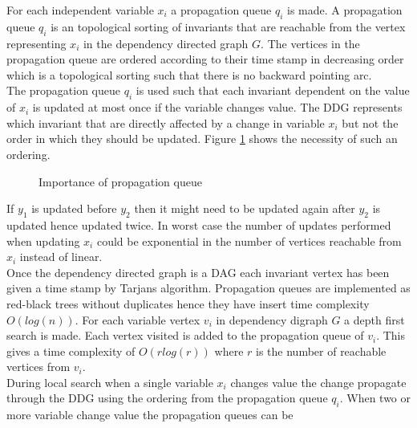 For each independent variable $x_i$ a propagation queue $q_i$ is made. A propagation queue $q_i$ is an 
topological sorting of invariants that are reachable from the vertex representing $x_i$ in the dependency directed 
graph $G$. The vertices in the propagation queue are ordered according to their time stamp in decreasing 
order which is a topological sorting such that there is no backward pointing arc. \\
The propagation queue $q_i$ is used such that each invariant dependent on the value of $x_i$ is updated at most once if 
the variable changes value. The DDG represents which invariant that are directly affected by a change in variable $x_i$ 
but not the order in which they should be updated. Figure \ref{fig_propqueue} shows the necessity of such an ordering. 
\\
\begin{figure}[b]
\centering
{}  \caption{Importance of propagation queue} \label{fig_propqueue}
\end{figure} 
If $y_1$ is updated before $y_2$ then it might need to be updated again after $y_2$ is updated hence updated 
twice. In worst case the number of updates performed when updating $x_i$ could be exponential in the number of vertices 
reachable from $x_i$ instead of linear. \\ 
Once the dependency directed graph is a DAG each invariant vertex has been given a time stamp by Tarjans algorithm. 
Propagation queues are implemented as red-black trees without duplicates hence they have insert time complexity 
$O(log(n))$. For each variable vertex $v_i$ in dependency digraph $G$ a depth first search is made. Each vertex 
visited is added to the propagation queue of $v_i$. This gives a time complexity of $O(rlog(r))$ where $r$ is the 
number of reachable vertices from $v_i$.  \medskip \\ 
During local search when a single variable $x_i$ changes value the change propagate through the DDG using 
the ordering from the propagation queue $q_i$. When two or more variable change value the propagation queues can be 
